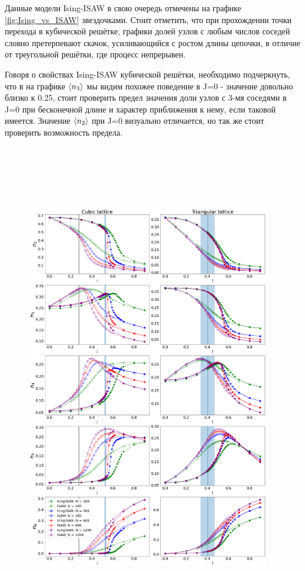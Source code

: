 Данные модели Ising-ISAW в свою очередь отмечены на графике \ref{fig:Ising_vs_ISAW} звездочками. Стоит отметить, что при прохождении точки перехода в кубической решётке, графики долей узлов с любым числов соседей словно претерпевают скачок, усиливающийся с ростом длины цепочки, в отличие от треугольной решётки, где процесс непрерывен.

Говоря о свойствах Ising-ISAW кубической решётки, необходимо подчеркнуть, что в на графике $\langle n_{3} \rangle$ мы видим похожее поведение в J=0 - значение довольно близко к 0.25, стоит проверить предел значения доли узлов с 3-мя соседями в J=0 при бесконечной длине и характер приближения к нему, если таковой имеется. Значение $\langle n_{2} \rangle$ при J=0 визуально отличается, но так же стоит проверить возможность предела.

\begin{figure}
    \centering
    \includegraphics[width=0.95\textwidth, height=21.5cm]{Sections/Images/Ising_vs_ISAW.png}

\end{figure}
